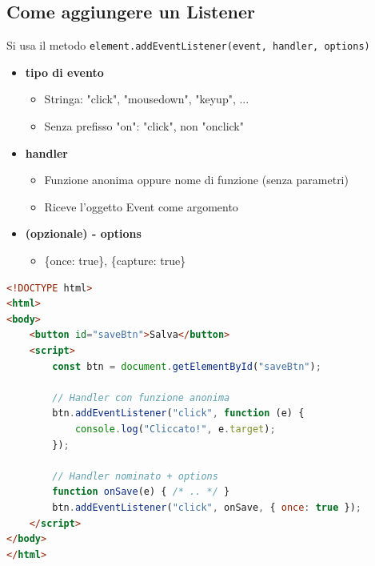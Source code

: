 \subsection{Come aggiungere un Listener}
Si usa il metodo \texttt{element.addEventListener(event, handler, options)}
\begin{itemize}
    \item \textbf{tipo di evento}
    \begin{itemize}
        \item Stringa: "click", "mousedown", "keyup", ...
        \item Senza prefisso "on": "click", non "onclick"
    \end{itemize}
    \item \textbf{handler}
    \begin{itemize}
        \item Funzione anonima oppure nome di funzione (senza parametri)
        \item Riceve l'oggetto Event come argomento
    \end{itemize}
    \item \textbf{(opzionale) - options}
    \begin{itemize}
        \item \{once: true\}, \{capture: true\}
    \end{itemize}
\end{itemize}

\begin{tcolorbox}[title={Esempio}]
\begin{lstlisting}[language=html]
<!DOCTYPE html>
<html>
<body>
    <button id="saveBtn">Salva</button>
    <script>
        const btn = document.getElementById("saveBtn");

        // Handler con funzione anonima
        btn.addEventListener("click", function (e) {
            console.log("Cliccato!", e.target);
        });

        // Handler nominato + options
        function onSave(e) { /* .. */ }
        btn.addEventListener("click", onSave, { once: true });
    </script>
</body>
</html>
\end{lstlisting}
\end{tcolorbox}
